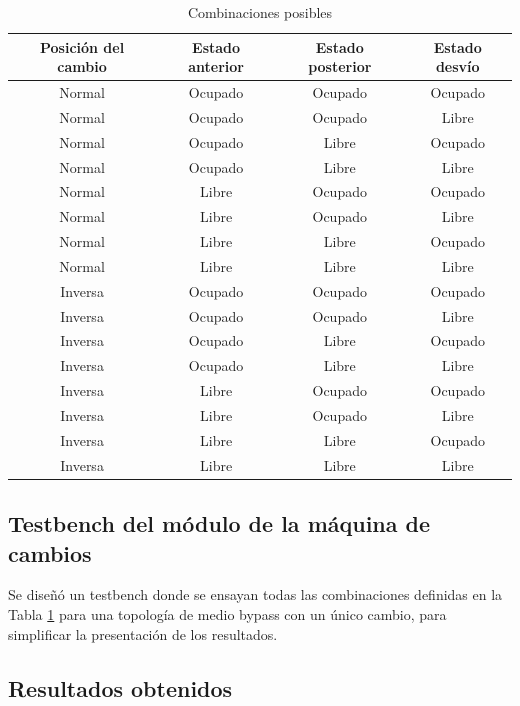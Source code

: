 			\begin{table}[!hbt]
			\renewcommand{\arraystretch}{1.3}
			\caption{Combinaciones posibles}
			\label{tabla_cambios}
			\centering
			\begin{tabular}{ c  c  c  c}
			\hline
			Posición del cambio & Estado anterior & Estado posterior & Estado desvío \\	
			\hline
			Normal & Ocupado & Ocupado  & Ocupado \\
			Normal & Ocupado & Ocupado  & Libre \\
			Normal & Ocupado & Libre  & Ocupado \\
			Normal & Ocupado & Libre  & Libre \\
			Normal & Libre & Ocupado  & Ocupado \\
			Normal & Libre & Ocupado  & Libre \\
			Normal & Libre & Libre  & Ocupado \\
			Normal & Libre & Libre  & Libre \\
			Inversa & Ocupado & Ocupado  & Ocupado \\
			Inversa & Ocupado & Ocupado  & Libre \\
			Inversa & Ocupado & Libre  & Ocupado \\
			Inversa & Ocupado & Libre  & Libre \\
			Inversa & Libre & Ocupado  & Ocupado \\
			Inversa & Libre & Ocupado  & Libre \\
			Inversa & Libre & Libre  & Ocupado \\
			Inversa & Libre & Libre  & Libre \\	
			\end{tabular}
			\end{table}	
	
	\subsection{Testbench del módulo de la máquina de cambios}
			
		Se diseñó un testbench donde se ensayan todas las combinaciones definidas en la Tabla \ref{tabla_cambios} para una topología de medio bypass con un único cambio, para simplificar la presentación de los resultados.
						
	\subsection{Resultados obtenidos}
			
